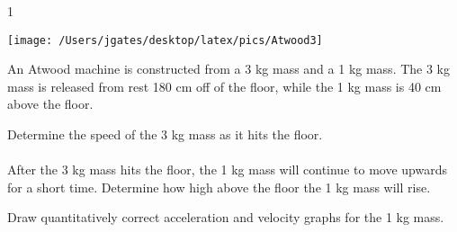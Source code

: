 
\AddToShipoutPicture*{\BackgroundPic}

\addtocounter {ProbNum} {1}

\begin{floatingfigure}[r]{.2\textwidth}
\texttt{[image: /Users/jgates/desktop/latex/pics/Atwood3]}
\end{floatingfigure}
 
{\bf \Large{}} An Atwood machine is constructed from a 3 kg mass and a 1 kg mass.  The 3 kg mass is released from rest 180 cm off of the floor, while the 1 kg mass is 40 cm above the floor.

\bigskip
Determine the speed of the 3 kg mass as it hits the floor.
\paragraph{}
\noindent
\vfill

After the 3 kg mass hits the floor, the 1 kg mass will continue to move upwards for a short time.  Determine how high above the floor the 1 kg mass will rise.
\vfill

Draw quantitatively correct acceleration and velocity graphs for the 1 kg mass.
\vfill
\newpage
